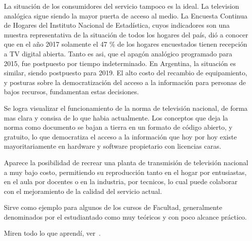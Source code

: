 La situación de los consumidores del servicio tampoco es la ideal. La television analógica sigue siendo la mayor puerta de acceso al medio. La Encuesta Continua de Hogares del Instituto Nacional de Estadística\cite{ine2017}, cuyos indicadores son una muestra representativa de la situación de todos los hogares del país, dió a conocer que en el año 2017 solamente el 47 \% de los hogares encuestados tienen recepción a TV digital abierta. Tanto es asi, que el apagón analógico programado para 2015, fue postpuesto por tiempo indeterminado. En Argentina, la situación es similar, siendo postpuesto para 2019. El alto costo del recambio de equipamiento, y posturas sobre la democratización del acceso a la información para personas de bajos recursos, fundamentan estas decisiones.
	
Se logra visualizar el funcionamiento de la norma de televisión nacional, de forma mas clara y consisa de lo que habia actualmente. Los conceptos que deja la norma como documento se bajan a tierra en un formato de código abierto, y gratuito, lo que democratiza el acceso a la información que hoy por hoy existe mayoritariamente en hardware y software propietario con licencias caras.
	
Aparece la posibilidad de recrear una planta de transmisión de televisión nacional a muy bajo costo, permitiendo su reproducción tanto en el hogar por entusiastas, en el aula por docentes o en la industria, por tecnicos, lo cual puede colaborar con el mejoramiento de la calidad del servicio actual.
	
Sirve como ejemplo para algunos de los cursos de Facultad, generalmente denominados por el estudiantado como muy teóricos y con poco alcance práctico. 


Miren todo lo que aprendí, ver~\cite{Autor}.

